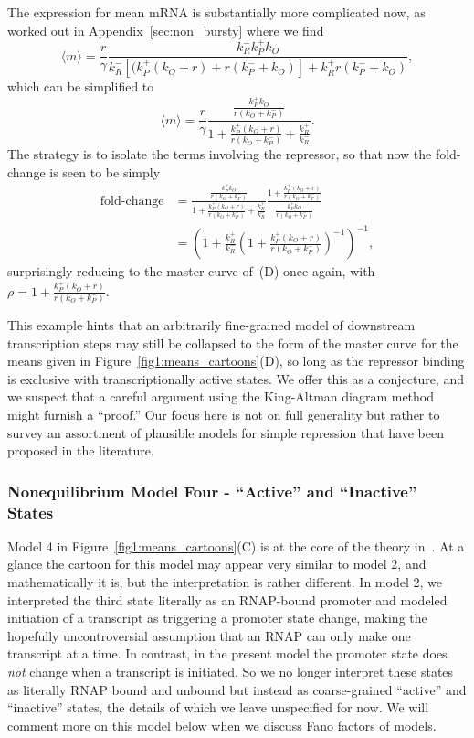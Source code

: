 The expression for mean mRNA is substantially more complicated now, as worked
out in Appendix~\ref{sec:non_bursty} where we find
\begin{equation}
\langle m\rangle = \frac{r}{\gamma}
        \frac{k_R^- k_P^+ k_O}
        {k_R^- [(k_P^+ (k_O + r) + r(k_P^- + k_O)] + k_R^+ r(k_P^- + k_O)},
\label{eq:model3_mean_m}
\end{equation}
which can be simplified to
\begin{equation}
\langle m\rangle
= \frac{r}{\gamma}
\frac{\frac{k_P^+ k_O}{r(k_O + k_P^-)}}
        {1 + \frac{k_P^+ (k_O + r)}{r(k_O + k_P^-)} + \frac{k_R^+}{k_R^-}}.
\end{equation}
The strategy is to isolate the terms involving the repressor, so that now the
fold-change is seen to be simply
\begin{align}
\text{fold-change}
&= \frac{\frac{k_P^+ k_O}{r(k_O + k_P^-)}}
        {1 + \frac{k_P^+ (k_O + r)}{r(k_O + k_P^-)} + \frac{k_R^+}{k_R^-}}
        \frac{1 + \frac{k_P^+ (k_O + r)}{r(k_O + k_P^-)}}
                {\frac{k_P^+ k_O}{r(k_O + k_P^-)}}
\\
&= \left(
        1 + \frac{k_R^+}{k_R^-}
        \left(1 + \frac{k_P^+ (k_O + r)}{r(k_O + k_P^-)}\right)^{-1}
\right)^{-1},
\end{align}
surprisingly reducing to the master curve of~(D) once
again, with $\rho = 1 + \frac{k_P^+ (k_O + r)}{r(k_O + k_P^-)}$.

This example hints that an arbitrarily fine-grained model of downstream
transcription steps may still be collapsed to the form of the master curve for
the means given in Figure~\ref{fig1:means_cartoons}(D), so long as the repressor
binding is exclusive with transcriptionally active states. We offer this as a
conjecture, and we suspect that a careful argument using the King-Altman diagram
method~\cite{King1956, Hill1966} might furnish a ``proof.'' Our focus here is
not on full generality but rather to survey an assortment of plausible models
for simple repression  that have been proposed in the literature.

\subsubsection{Nonequilibrium Model Four - ``Active'' and ``Inactive'' States}
Model 4 in Figure~\ref{fig1:means_cartoons}(C) is at the core of the theory
in~\cite{Razo-Mejia2020}. At a glance the cartoon for this model may appear very
similar to model 2, and mathematically it is, but the interpretation is rather
different. In model 2, we interpreted the third state literally as an RNAP-bound
promoter and modeled initiation of a transcript as triggering a promoter state
change, making the hopefully uncontroversial assumption that an RNAP can only
make one transcript at a time. In contrast, in the present model the promoter
state does \textit{not} change when a transcript is initiated. So we no longer
interpret these states as literally RNAP bound and unbound but instead as
coarse-grained ``active'' and ``inactive'' states, the details of which we leave
unspecified for now. We will comment more on this model below when we discuss
Fano factors of models.

